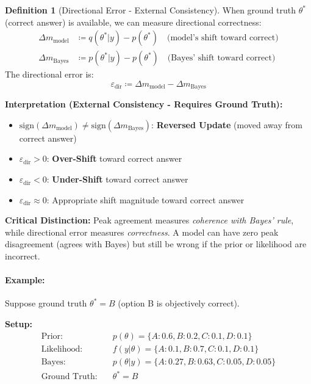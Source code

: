 \documentclass{article}
\theoremstyle{definition}
\newtheorem{definition}{Definition}
\begin{document}
\begin{definition}[Directional Error - External Consistency]
When ground truth $\theta^*$ (correct answer) is available, we can measure directional correctness:
\begin{align}
\Delta m_{\text{model}} &\coloneqq q(\theta^*|y) - p(\theta^*) \quad \text{(model's shift toward correct)} \\
\Delta m_{\text{Bayes}} &\coloneqq p(\theta^*|y) - p(\theta^*) \quad \text{(Bayes' shift toward correct)}
\end{align}
The directional error is:
\begin{equation}
\varepsilon_{\text{dir}} \coloneqq \Delta m_{\text{model}} - \Delta m_{\text{Bayes}}
\end{equation}
\end{definition}

\textbf{Interpretation (External Consistency - Requires Ground Truth):}
\begin{itemize}
    \item $\text{sign}(\Delta m_{\text{model}}) \neq \text{sign}(\Delta m_{\text{Bayes}})$: \textbf{Reversed Update} (moved away from correct answer)
    \item $\varepsilon_{\text{dir}} > 0$: \textbf{Over-Shift} toward correct answer
    \item $\varepsilon_{\text{dir}} < 0$: \textbf{Under-Shift} toward correct answer
    \item $\varepsilon_{\text{dir}} \approx 0$: Appropriate shift magnitude toward correct answer
\end{itemize}

\textbf{Critical Distinction:} Peak agreement measures \emph{coherence with Bayes' rule}, while directional error measures \emph{correctness}. A model can have zero peak disagreement (agrees with Bayes) but still be wrong if the prior or likelihood are incorrect.

\paragraph{Example:} Suppose ground truth $\theta^* = B$ (option B is objectively correct).

\textbf{Setup:}
\begin{align*}
\text{Prior:} \quad &p(\theta) = \{A: 0.6, B: 0.2, C: 0.1, D: 0.1\} \\
\text{Likelihood:} \quad &f(y|\theta) = \{A: 0.1, B: 0.7, C: 0.1, D: 0.1\} \\
\text{Bayes:} \quad &p(\theta|y) = \{A: 0.27, B: 0.63, C: 0.05, D: 0.05\} \\
\text{Ground Truth:} \quad &\theta^* = B
\end{align*}
\end{document}
